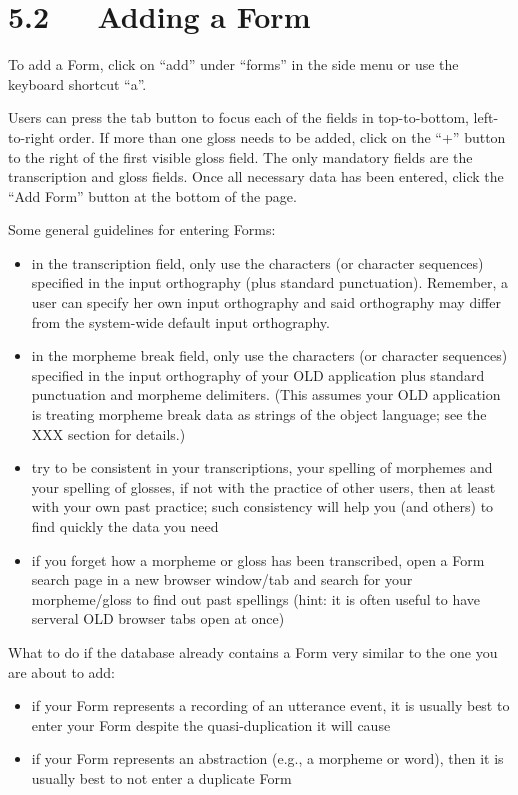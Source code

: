 \documentclass[letterpaper,10pt,english]{sphinxmanual}
\begin{document}
\section{5.2   Adding a Form}
\label{documentation:adding-a-form}
To add a Form, click on ``add'' under ``forms'' in the side menu or use the keyboard
shortcut ``a''.

Users can press the tab button to focus each of the fields in top-to-bottom,
left-to-right order.  If more than one gloss needs to be added, click on the ``+''
button to the right of the first visible gloss field.  The only mandatory fields
are the transcription and gloss fields.  Once all necessary data has been
entered, click the ``Add Form'' button at the bottom of the page.

Some general guidelines for entering Forms:
\begin{itemize}
\item {} 
in the transcription field, only use the characters (or character sequences)
specified in the input orthography (plus standard punctuation).  Remember,
a user can specify her own input orthography and said orthography may differ
from the system-wide default input orthography.

\item {} 
in the morpheme break field, only use the characters (or character sequences)
specified in the input orthography of your OLD application plus standard
punctuation and morpheme delimiters.  (This assumes your OLD application is
treating morpheme break data as strings of the object language; see the XXX
section for details.)

\item {} 
try to be consistent in your transcriptions, your spelling of morphemes and
your spelling of glosses, if not with the practice of other users, then at
least with your own past practice; such consistency will help you (and others)
to find quickly the data you need

\item {} 
if you forget how a morpheme or gloss has been transcribed, open a Form search
page in a new browser window/tab and search for your morpheme/gloss to find
out past spellings (hint: it is often useful to have serveral OLD browser tabs
open at once)

\end{itemize}

What to do if the database already contains a Form very similar to the one you
are about to add:
\begin{itemize}
\item {} 
if your Form represents a recording of an utterance event, it is usually best
to enter your Form despite the quasi-duplication it will cause

\item {} 
if your Form represents an abstraction (e.g., a morpheme or word), then it is
usually best to not enter a duplicate Form

\end{itemize}
\end{document}
